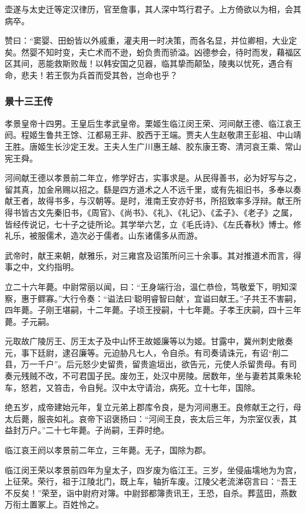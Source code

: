 \documentclass[]{article}
\begin{document}
壶遂与太史迁等定汉律历，官至詹事，其人深中笃行君子。上方倚欲以为相，会其病卒。

赞曰：``窦婴、田蚡皆以外戚重，灌夫用一时决策，而各名显，并位卿相，大业定矣。然婴不知时变，夫亡术而不逊，蚡负贵而骄溢。凶德参会，待时而发，藉福区区其间，恶能救斯败哉！以韩安国之见器，临其挚而颠坠，陵夷以忧死，遇合有命，悲夫！若王恢为兵首而受其咎，岂命也乎？

\hypertarget{header-n4347}{%
\subsubsection{景十三王传}\label{header-n4347}}

孝景皇帝十四男。王皇后生孝武皇帝。栗姬生临江闵王荣、河间献王德、临江哀王阏。程姬生鲁共王馀、江都易王非、胶西于王端。贾夫人生赵敬肃王彭祖、中山靖王胜。唐姬生长沙定王发。王夫人生广川惠王越、胶东康王寄、清河哀王乘、常山宪王舜。

河间献王德以孝景前二年立，修学好古，实事求是。从民得善书，必为好写与之，留其真，加金帛赐以招之。繇是四方道术之人不远千里，或有先祖旧书，多奉以奏献王者，故得书多，与汉朝等。是时，淮南王安亦好书，所招致率多浮辩。献王所得书皆古文先秦旧书，《周官》、《尚书》、《礼》、《礼记》、《孟子》、《老子》之属，皆经传说记，七十子之徒所论。其学举六艺，立《毛氏诗》、《左氏春秋》博士。修礼乐，被服儒术，造次必于儒者。山东诸儒多从而游。

武帝时，献王来朝，献雅乐，对三雍宫及诏策所问三十余事。其对推道术而言，得事之中，文约指明。

立二十六年薨。中尉常丽以闻，曰：``王身端行治，温仁恭俭，笃敬爱下，明知深察，惠于鳏寡。''大行令奏：``谥法曰`聪明睿智曰献'，宜谥曰献王。''子共王不害嗣，四年薨。子刚王堪嗣，十二年薨。子顷王授嗣，十七年薨。子孝王庆嗣，四十三年薨。子元嗣。

元取故广陵厉王、厉王太子及中山怀王故姬廉等以为姬。甘露中，冀州刺史敞奏元，事下廷尉，逮召廉等。元迫胁凡七人，令自杀。有司奏请诛元，有诏``削二县，万一千户''。后元怒少史留贵，留贵逾垣出，欲告元，元使人杀留贵母。有司奏元残贼不改，不可君国子民。废勿王，处汉中房陵。居数年，坐与妻若其乘朱轮车，怒若，又笞击，令自髡。汉中太守请治，病死。立十七年，国除。

绝五岁，成帝建始元年，复立元弟上郡库令良，是为河间惠王。良修献王之行，母太后薨，服丧如礼。哀帝下诏褒扬曰：``河间王良，丧太后三年，为宗室仪表，其益封万户。''二十七年薨。子尚嗣，王莽时绝。

临江哀王阏以孝景前二年立，三年薨。无子，国除为郡。

临江闵王荣以孝景前四年为皇太子，四岁废为临江王。三岁，坐侵庙壖地为为宫，上征荣。荣行，祖于江陵北门，既上车，轴折车废。江陵父老流涕窃言曰：``吾王不反矣！''荣至，诣中尉府对簿。中尉郅都簿责讯王，王恐，自杀。葬蓝田，燕数万衔土置冢上。百姓怜之。
\end{document}
